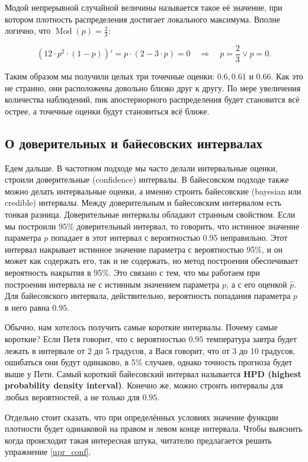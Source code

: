 \documentclass[12pt, a4paper, oneside]{extreport}
\DeclareMathOperator{\Mod}{Mod}
\newcommand{\indef}[1]{\textbf{#1}}     %
\theoremstyle{plain}              %
\theoremstyle{definition}         %
\begin{document}
Модой непрерывной случайной величины называется такое её значение, при котором плотность распределения достигает локального максимума. Вполне логично, что $\Mod(p) = \frac{2}{3}$:

\[ (12 \cdot p^2 \cdot (1-p) )' = p \cdot (2 - 3 \cdot p) = 0 \quad \Rightarrow \quad p = \frac{2}{3} \vee p = 0.\]

Таким образом мы получили целых три точечные оценки: $0.6, 0.61$ и $0.66$. Как это не странно, они расположены довольно близко друг к другу. По мере увеличения количества наблюдений, пик апостериорного распределения будет становится всё острее, а точечные оценки будут становиться всё ближе.

\subsection*{О доверительных и байесовских интервалах}

Едем дальше. В частотном подходе мы часто делали интервальные оценки, строили доверительные (confidence) интервалы. В байесовском подходе также можно делать интервальные оценки, а именно строить байесовские (bayesian или credible) интервалы. Между доверительным и байесовским интервалом есть тонкая разница. Доверительные интервалы обладают странным свойством. Если мы построили 95\% доверительный интервал, то говорить, что истинное значение параметра $p$ попадает в этот интервал с вероятностью $0.95$ неправильно. Этот интервал накрывает истинное значение параметра с вероятностью 95\%, и он может как содержать его, так и не содержать, но метод построения обеспечивает вероятность накрытия в 95\%. Это связано с тем, что мы работаем при построении интервала не с истинным значением параметра $p$, а с его оценкой $\hat p$. Для байесовского интервала, действительно, вероятность попадания параметра $p$ в него равна $0.95$.

Обычно, нам хотелось получить самые короткие интервалы. Почему самые короткие? Если Петя говорит, что с вероятностью $0.95$ температура завтра будет лежать в интервале от 2 до 5 градусов, а Вася говорит, что от 3 до 10 градусов, ошибаться они будут одинаково, в 5\% случаев, однако точность прогноза будет выше у Пети. Самый короткий байесовский интервал называется \indef{HPD (highest probability density interval)}. Конечно же, можно строить интервалы для любых вероятностей, а не только для $0.95$. 

Отдельно стоит сказать, что при определённых условиях значение функции плотности будет одинаковой на правом и левом конце интервала. Чтобы выяснить когда происходит такая интересная штука, читателю предлагается решить упражнение \ref{upr_conf}.
\end{document}
